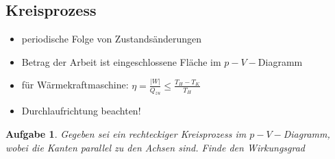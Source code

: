 \documentclass[a4paper,12pt]{extarticle}
\theoremstyle{problemstyle}
\newtheorem{problem}{Aufgabe}
\begin{document}
\begin{multicols}{2}
\section*{Kreisprozess}
\begin{itemize}
\item periodische Folge von Zustandsänderungen
\item Betrag der Arbeit ist eingeschlossene Fläche im $p-V-$Diagramm
\item für Wärmekraftmaschine: $\eta = \frac{|W|}{Q_{zu}} \leq \frac{T_H-T_K}{T_H}$
\item Durchlaufrichtung beachten!
\end{itemize}
\begin{problem}
Gegeben sei ein rechteckiger Kreisprozess im $p-V-$Diagramm, wobei die Kanten parallel zu den Achsen sind. Finde den Wirkungsgrad
\end{problem}
\end{multicols}
\end{document}
